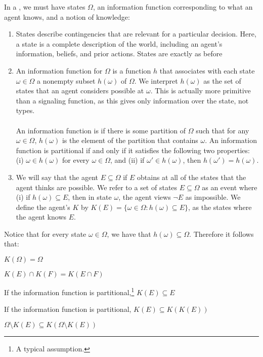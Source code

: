 \documentclass[10pt]{article}
\begin{document}
\begin{model}
	In a , we must have states $\Omega$, an information function corresponding to what an agent knows, and a notion of knowledge:
	\begin{enumerate}
		\item States describe contingencies that are relevant for a particular decision. Here, a state is a complete description of the world, including an agent's information, beliefs, and prior actions. States are exactly as before
		\item An information function for $\Omega$ is a function $h$ that associates with each state $\omega \in \Omega$ a nonempty subset $h(\omega)$ of $\Omega$. We interpret $h(\omega)$ as the set of states that an agent considers possible at $\omega$. This is actually more primitive than a signaling function, as this gives only information over the state, not types. \\\\An information function is  if there is some partition of $\Omega$ such that for any $\omega \in \Omega$, $h(\omega)$ is the element of the partition that contains $\omega$. An information function is partitional if and only if it satisfies the following two properties: (i) $\omega \in h(\omega)$ for every $\omega \in \Omega$, and (ii) if $\omega' \in h(\omega)$, then $h(\omega')=h(\omega)$.
		\item We will say that the agent  $E \subseteq \Omega$ if $E$ obtains at all of the states that the agent thinks are possible. We refer to a set of states $E \subseteq \Omega$ as an event where (i) if $h(\omega) \subseteq E$, then in state $\omega$, the agent views $\neg E$ as impossible. We define the agent's  $K$ by $K(E) = \{\omega\in \Omega : h(\omega) \subseteq E\}$, as the states where the agent knows $E$.
	\end{enumerate}
\end{model}

\begin{remark}
	Notice that for every state $\omega \in \Omega$, we have that $h(\omega) \subseteq \Omega$. Therefore it follows that:
\end{remark}
\begin{axiom}
	 $K(\Omega) = \Omega$
\end{axiom}
\begin{axiom}
	 $K(E) \cap K(F) = K(E\cap F)$
\end{axiom}
\begin{axiom}
	 If the information function is partitional,\footnote{A typical assumption.} $K(E) \subseteq E$
\end{axiom}
\begin{axiom}
	 If the information function is partitional, $K(E) \subseteq K(K(E))$
\end{axiom}
\begin{axiom}
	 $\Omega \setminus K(E) \subseteq K(\Omega \setminus K(E))$
\end{axiom}
\end{document}
